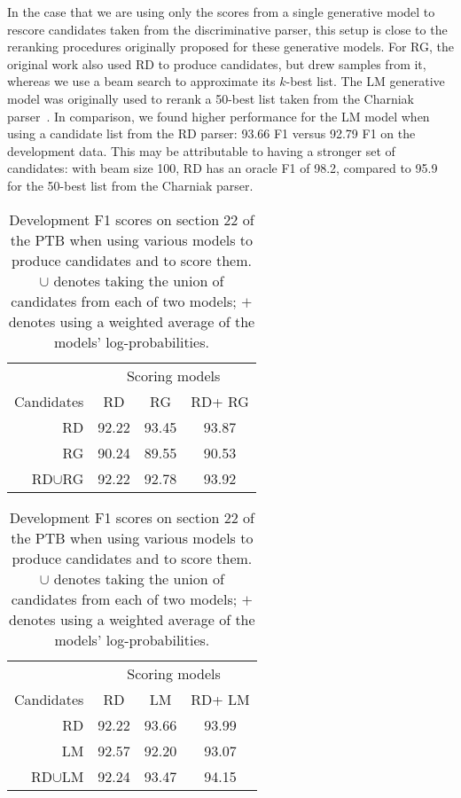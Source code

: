 \documentclass[11pt,a4paper]{article}
\newcommand{\rnngd}{\textsc{RD}\xspace}
\newcommand{\lstm}{\textsc{LM}\xspace}
\newcommand{\rnngg}{\textsc{RG}\xspace}
\newcommand{\un}{\ensuremath{\cup}\xspace}
\begin{document}
In the case that we are using only the scores from a single generative model to rescore candidates taken from the discriminative parser, this setup is close to the reranking procedures originally proposed for these generative models. For RG, the original work also used RD to produce candidates, but drew samples from it, whereas we use a beam search to approximate its $k$-best list. 
The LM generative model was originally used to rerank a 50-best list taken from the Charniak parser~\citep{Charniak:2000:MP:974305.974323}. In comparison, we found higher performance for the LM model when using a candidate list from the RD parser: 93.66 F1 versus 92.79 F1 on the development data. This may be attributable to having a stronger set of candidates: with beam size 100, RD has an oracle F1 of 98.2, compared to 95.9 for the 50-best list from the Charniak parser.

\begin{table}
\centering
\begin{tabular}{r|ccc}
& \multicolumn{3}{c}{Scoring models} \\
Candidates & \rnngd & \rnngg & \rnngd+ \rnngg \\
\hline
\rnngd & 92.22 & 93.45 & 93.87 \\
\rnngg & 90.24 & 89.55 & 90.53 \\
\rnngd \un \rnngg & 92.22 & 92.78 & 93.92  \\
\end{tabular}

\vspace{5pt}

\begin{tabular}{r|ccc}
& \multicolumn{3}{c}{Scoring models} \\
Candidates & \rnngd & \lstm & \rnngd+ \lstm \\
\hline
\rnngd & 92.22 & 93.66 & 93.99 \\
\lstm & 92.57 & 92.20 & 93.07 \\
\rnngd \un \lstm & 92.24 & 93.47 & 94.15  \\
\end{tabular}
\caption{\label{tab:lstm_model_score_combos} Development F1 scores on section 22 of the PTB when using various models to produce candidates and to score them. $\cup$ denotes taking the union of candidates from each of two models; $+$ denotes using a weighted average of the models' log-probabilities.
\vspace{-1em}
}
\end{table}
\end{document}
